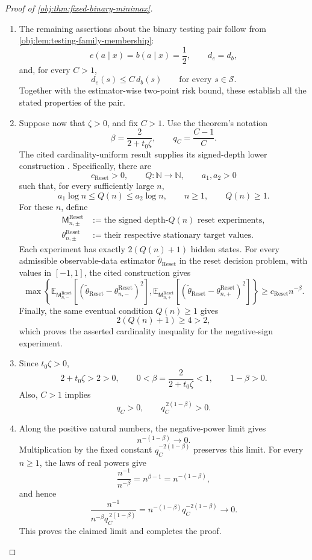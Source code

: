 \documentclass[11pt]{article}
\begin{document}
\begin{proof}[Proof of \cref{obj:thm:fixed-binary-minimax}]
\begin{enumerate}
\item The remaining assertions about the binary testing pair follow from
\cref{obj:lem:testing-family-membership}:
\[
e(a\mid x)=b(a\mid x)=\frac12,
\qquad d_e=d_b,
\]
and, for every \(C>1\),
\[
d_e(s)\leq C\,d_b(s)
\qquad\text{for every }s\in\mathcal S.
\]
Together with the estimator-wise two-point risk bound, these establish all the stated properties of the pair.

\item Suppose now that \(\zeta>0\), and fix \(C>1\). Use the theorem's notation
\[
\beta=\frac2{2+t_0\zeta},
\qquad
q_C=\frac{C-1}{C}.
\]
The cited cardinality-uniform result supplies its signed-depth lower construction
\citep[Theorem 1 (Uniform overlap frontier) and the Signed-depth family definition]{CausalSmithLatentOverlap2026}.
Specifically, there are
\[
c_{\mathrm{Reset}}>0,\qquad
Q:\mathbb N\to\mathbb N,\qquad a_1,a_2>0
\]
such that, for every sufficiently large \(n\),
\[
a_1\log n\leq Q(n)\leq a_2\log n,
\qquad n\geq1,\qquad Q(n)\geq1.
\]
For these \(n\), define
\[
\begin{aligned}
\mathsf M_{n,\pm}^{\mathrm{Reset}}
&:=\text{the signed depth-}Q(n)\text{ reset experiments},\\
\theta_{n,\pm}^{\mathrm{Reset}}
&:=\text{their respective stationary target values}.
\end{aligned}
\]
Each experiment has exactly \(2(Q(n)+1)\) hidden states. For every admissible observable-data estimator
\(\widetilde\theta_{\mathrm{Reset}}\) in the reset decision problem, with values in \([-1,1]\), the cited construction gives
\[
\max\left\{
\mathbb E_{\mathsf M_{n,-}^{\mathrm{Reset}}}
[(\widetilde\theta_{\mathrm{Reset}}
-\theta_{n,-}^{\mathrm{Reset}})^2],
\mathbb E_{\mathsf M_{n,+}^{\mathrm{Reset}}}
[(\widetilde\theta_{\mathrm{Reset}}
-\theta_{n,+}^{\mathrm{Reset}})^2]
\right\}
\geq c_{\mathrm{Reset}}n^{-\beta}.
\]
Finally, the same eventual condition \(Q(n)\geq1\) gives
\[
2(Q(n)+1)\geq4>2,
\]
which proves the asserted cardinality inequality for the negative-sign experiment.

\item Since \(t_0\zeta>0\),
\[
2+t_0\zeta>2>0,
\qquad
0<\beta=\frac2{2+t_0\zeta}<1,
\qquad
1-\beta>0.
\]
Also, \(C>1\) implies
\[
q_C>0,
\qquad q_C^{\,2(1-\beta)}>0.
\]

\item Along the positive natural numbers, the negative-power limit gives
\[
n^{-(1-\beta)}\longrightarrow0.
\]
Multiplication by the fixed constant
\(q_C^{-2(1-\beta)}\) preserves this limit. For every \(n\geq1\), the laws of real powers give
\[
\frac{n^{-1}}{n^{-\beta}}
=n^{\beta-1}=n^{-(1-\beta)},
\]
and hence
\[
\frac{n^{-1}}
{n^{-\beta}q_C^{\,2(1-\beta)}}
=
n^{-(1-\beta)}q_C^{-2(1-\beta)}
\longrightarrow0.
\]
This proves the claimed limit and completes the proof.
\end{enumerate}
\end{proof}
\end{document}
